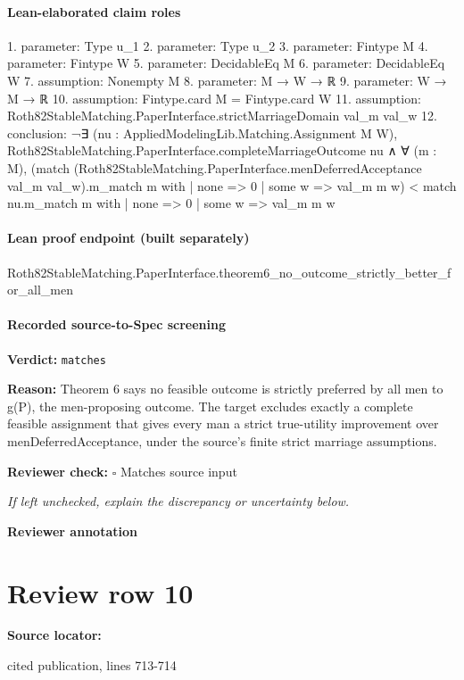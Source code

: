 \documentclass[10pt]{article}
\newcommand{\reviewerbox}{%
  \par\noindent\fbox{\parbox{0.96\linewidth}{\rule{0pt}{0.38in}}}\par
}
\newcommand{\reviewmatch}[1]{%
  \par\noindent\textbf{Reviewer check:} $\square$\; #1\par
  \noindent\emph{If left unchecked, explain the discrepancy or uncertainty below.}\par
}
\begin{document}
\paragraph{Lean-elaborated claim roles}\begin{ReviewVerbatim}
1. parameter: Type u_1
2. parameter: Type u_2
3. parameter: Fintype M
4. parameter: Fintype W
5. parameter: DecidableEq M
6. parameter: DecidableEq W
7. assumption: Nonempty M
8. parameter: M → W → ℝ
9. parameter: W → M → ℝ
10. assumption: Fintype.card M = Fintype.card W
11. assumption: Roth82StableMatching.PaperInterface.strictMarriageDomain val_m val_w
12. conclusion: ¬∃ (nu : AppliedModelingLib.Matching.Assignment M W),
    Roth82StableMatching.PaperInterface.completeMarriageOutcome nu ∧
      ∀ (m : M),
        (match (Roth82StableMatching.PaperInterface.menDeferredAcceptance val_m val_w).m_match m with
          | none => 0
          | some w => val_m m w) <
          match nu.m_match m with
          | none => 0
          | some w => val_m m w
\end{ReviewVerbatim}

\paragraph{Lean proof endpoint (built separately)}\begin{ReviewVerbatim}
Roth82StableMatching.PaperInterface.theorem6_no_outcome_strictly_better_for_all_men
\end{ReviewVerbatim}

\paragraph{Recorded source-to-Spec screening}
\textbf{Verdict:} \texttt{matches}
\\
{\raggedright
\textbf{Reason:} Theorem 6 says no feasible outcome is strictly preferred by all men to g(P), the men-\allowbreak{}proposing outcome.\allowbreak{}  The target excludes exactly a complete feasible assignment that gives every man a strict true-\allowbreak{}utility improvement over menDeferredAcceptance, under the source's finite strict marriage assumptions.\allowbreak{}
\par}
\reviewmatch{Matches source input}
\noindent\textbf{Reviewer annotation}\par
\reviewerbox
\clearpage
\hypertarget{source-claim-775470afdcdc7bf3}{}
\section*{Review row 10}
\textbf{Source locator:} {\footnotesize\raggedright cited publication, lines 713-\allowbreak{}714\par}
\end{document}
